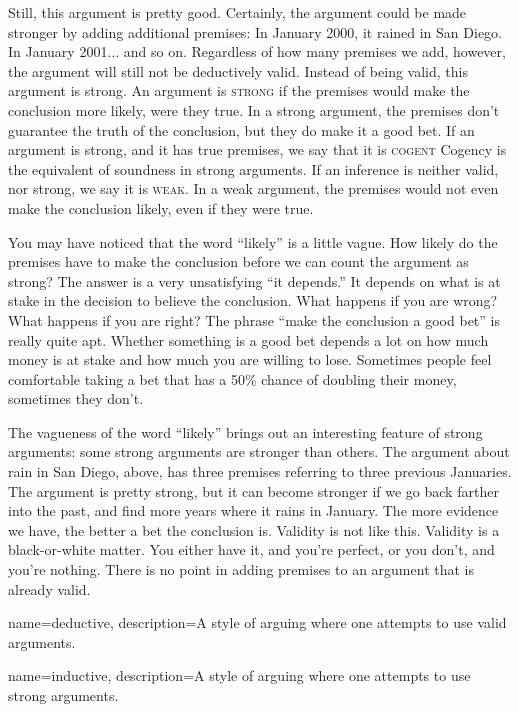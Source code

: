 Still, this argument is pretty good. Certainly, the argument could be made stronger by adding additional premises: In January 2000, it rained in San Diego. In January 2001$\ldots$ and so on. Regardless of how many premises we add, however, the argument will still not be deductively valid. Instead of being valid, this argument is strong. An argument is \textsc{\gls{strong}} \label{def:strong} if the premises would make the conclusion more likely, were they true. In a strong argument, the premises don't guarantee the truth of the conclusion, but they do make it a good bet. If an argument is strong, and it has true premises, we say that it is \textsc{\gls{cogent}} \label{def:cogent} Cogency is the equivalent of soundness in strong arguments. If an inference is neither valid, nor strong, we say it is \textsc{\gls{weak}}. \label{def:weak}In a weak argument, the premises would not even make the conclusion likely, even if they were true.

You may have noticed that the word ``likely'' is a little vague. How likely do the premises have to make the conclusion before we can count the argument as strong? The answer is a very unsatisfying ``it depends.'' It depends on what is at stake in the decision to believe the conclusion. What happens if you are wrong? What happens if you are right? The phrase ``make the conclusion a good bet'' is really quite apt. Whether something is a good bet depends a lot on how much money is at stake and how much you are willing to lose. Sometimes people feel comfortable taking a bet that has a 50\% chance of doubling their money, sometimes they don't.

The vagueness of the word ``likely'' brings out an interesting feature of strong arguments: some strong arguments are stronger than others. The argument about rain in San Diego, above, has three premises referring to three previous Januaries. The argument is pretty strong, but it can become stronger if we go back farther into the past, and find more years where it rains in January. The more evidence we have, the better a bet the conclusion is. Validity is not like this. Validity is a black-or-white matter. You either have it, and you're perfect, or you don't, and you're nothing. There is no point in adding premises to an argument that is already valid.

{
name=deductive,
description={A style of arguing where one attempts to use valid arguments.}
}

{
name=inductive,
description={A style of arguing where one attempts to use strong arguments.}
}

